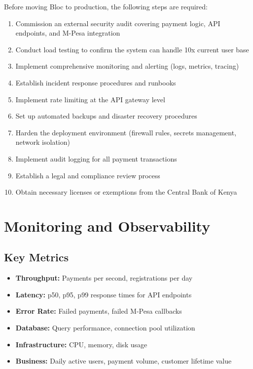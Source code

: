 \documentclass[12pt, a4paper, twoside, openright]{report}
\begin{document}
Before moving Bloc to production, the following steps are required:

\begin{enumerate}
    \item[\textcolor{red}{CRITICAL}] Commission an external security audit covering payment logic, API endpoints, and M-Pesa integration
    \item[\textcolor{red}{CRITICAL}] Conduct load testing to confirm the system can handle 10x current user base
    \item[\textcolor{red}{CRITICAL}] Implement comprehensive monitoring and alerting (logs, metrics, tracing)
    \item[\textcolor{red}{CRITICAL}] Establish incident response procedures and runbooks
    \item Implement rate limiting at the API gateway level
    \item Set up automated backups and disaster recovery procedures
    \item Harden the deployment environment (firewall rules, secrets management, network isolation)
    \item Implement audit logging for all payment transactions
    \item Establish a legal and compliance review process
    \item Obtain necessary licenses or exemptions from the Central Bank of Kenya
\end{enumerate}

\section{Monitoring and Observability}

\subsection{Key Metrics}

\begin{itemize}
    \item \textbf{Throughput:} Payments per second, registrations per day
    \item \textbf{Latency:} p50, p95, p99 response times for API endpoints
    \item \textbf{Error Rate:} Failed payments, failed M-Pesa callbacks
    \item \textbf{Database:} Query performance, connection pool utilization
    \item \textbf{Infrastructure:} CPU, memory, disk usage
    \item \textbf{Business:} Daily active users, payment volume, customer lifetime value
\end{itemize}
\end{document}
